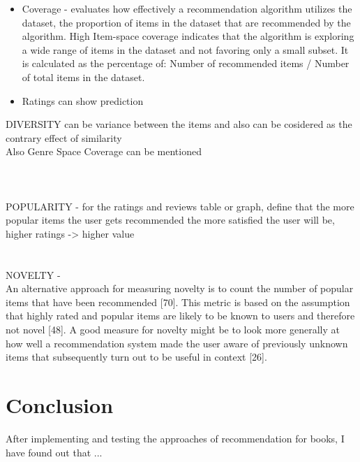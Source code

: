 \documentclass[\myFontSize,oneside,english,hidelinks,a4paper]{article}
\begin{document}
\begin{itemize}
\item Coverage - evaluates how effectively a recommendation algorithm utilizes the dataset, the proportion of items in the dataset that are recommended by the algorithm. High Item-space coverage indicates that the algorithm is exploring a wide range of items in the dataset and not favoring only a small subset. It is calculated as the percentage of: Number of recommended items / Number of total items in the dataset.

\item Ratings can show prediction


\end{itemize}


DIVERSITY can be variance between the items and also can be cosidered as the contrary effect of similarity\cite{Silveira2019813}\\
Also Genre Space Coverage can be mentioned\\\\\\\\

POPULARITY - for the ratings and reviews table or graph, define that the more popular items the user gets recommended the more satisfied the user will be, higher ratings -> higher value\\\\\\

NOVELTY - \\
An alternative approach for measuring novelty is to count the number of popular
items that have been recommended [70]. This metric is based on the assumption
that highly rated and popular items are likely to be known to users and therefore
not novel [48]. A good measure for novelty might be to look more generally at how
well a recommendation system made the user aware of previously unknown items
that subsequently turn out to be useful in context [26].\cite{Avazpour2014245}\\



\clearpage{}
\section{Conclusion}
After implementing and testing the approaches of recommendation for books, I have found out that ...\\
\end{document}
